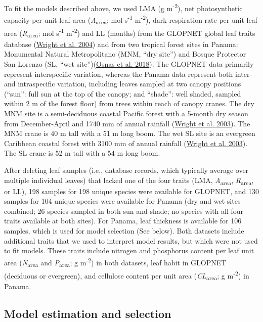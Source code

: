 \documentclass[
  12pt,
]{article}
\begin{document}
To fit the models described above, we used LMA (g m\textsuperscript{-2}), net photosynthetic capacity per unit leaf area (\emph{A}\textsubscript{area}; mol s\textsuperscript{-1} m\textsuperscript{-2}), dark respiration rate per unit leaf area (\emph{R}\textsubscript{area}; mol s\textsuperscript{-1} m\textsuperscript{-2}) and LL (months) from the GLOPNET global leaf traits database (\protect\hyperlink{ref-Wright2004a}{Wright et al. 2004}) and from two tropical forest sites in Panama: Monumental Natural Metropolitano (MNM, ``dry site'') and Bosque Protector San Lorenzo (SL, ``wet site'')(\protect\hyperlink{ref-Osnas2018}{Osnas et al. 2018}).
The GLOPNET data primarily represent interspecific variation, whereas the Panama data represent both inter- and intraspecific variation, including leaves sampled at two canopy positions (``sun'': full sun at the top of the canopy; and ``shade'': well shaded, sampled within 2 m of the forest floor) from trees within reach of canopy cranes.
The dry MNM site is a semi-deciduous coastal Pacific forest with a 5-month dry season from December-April and 1740 mm of annual rainfall (\protect\hyperlink{ref-Wright2003}{Wright et al. 2003}).
The MNM crane is 40 m tall with a 51 m long boom. The wet SL site is an evergreen Caribbean coastal forest with 3100 mm of annual rainfall (\protect\hyperlink{ref-Wright2003}{Wright et al. 2003}). The SL crane is 52 m tall with a 54 m long boom.

After deleting leaf samples (i.e., database records, which typically average over multiple individual leaves) that lacked one of the four traits (LMA, \emph{A}\textsubscript{area}, \emph{R}\textsubscript{area}, or LL), 198 samples for 198 unique species were available for GLOPNET, and 130 samples for 104 unique species were available for Panama (dry and wet sites combined; 26 species sampled in both sun and shade; no species with all four traits available at both sites).
For Panama, leaf thickness is available for 106 samples, which is used for model selection (See below).
Both datasets include additional traits that we used to interpret model results, but which were not used to fit models. These traits include nitrogen and phosphorus content per leaf unit area (\emph{N}\textsubscript{area} and \emph{P}\textsubscript{area}; g m\textsuperscript{-2}) in both datasets, leaf habit in GLOPNET (deciduous or evergreen), and cellulose content per unit area (\emph{CL}\textsubscript{area}; g m\textsuperscript{-2}) in Panama.

\hypertarget{model-estimation-and-selection}{%
\subsection{Model estimation and selection}\label{model-estimation-and-selection}}
\end{document}
